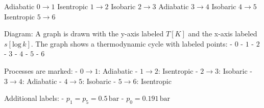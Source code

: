Adiabatic \( 0 \rightarrow 1 \)  
Isentropic \( 1 \rightarrow 2 \)  
Isobaric \( 2 \rightarrow 3 \)  
Adiabatic \( 3 \rightarrow 4 \)  
Isobaric \( 4 \rightarrow 5 \)  
Isentropic \( 5 \rightarrow 6 \)  

Diagram:  
A graph is drawn with the y-axis labeled \( T [K] \) and the x-axis labeled \( s [\text{log} \, k] \).  
The graph shows a thermodynamic cycle with labeled points:  
- \( 0 \)  
- \( 1 \)  
- \( 2 \)  
- \( 3 \)  
- \( 4 \)  
- \( 5 \)  
- \( 6 \)  

Processes are marked:  
- \( 0 \rightarrow 1 \): Adiabatic  
- \( 1 \rightarrow 2 \): Isentropic  
- \( 2 \rightarrow 3 \): Isobaric  
- \( 3 \rightarrow 4 \): Adiabatic  
- \( 4 \rightarrow 5 \): Isobaric  
- \( 5 \rightarrow 6 \): Isentropic  

Additional labels:  
- \( p_1 = p_5 = 0.5 \, \text{bar} \)  
- \( p_0 = 0.191 \, \text{bar} \)